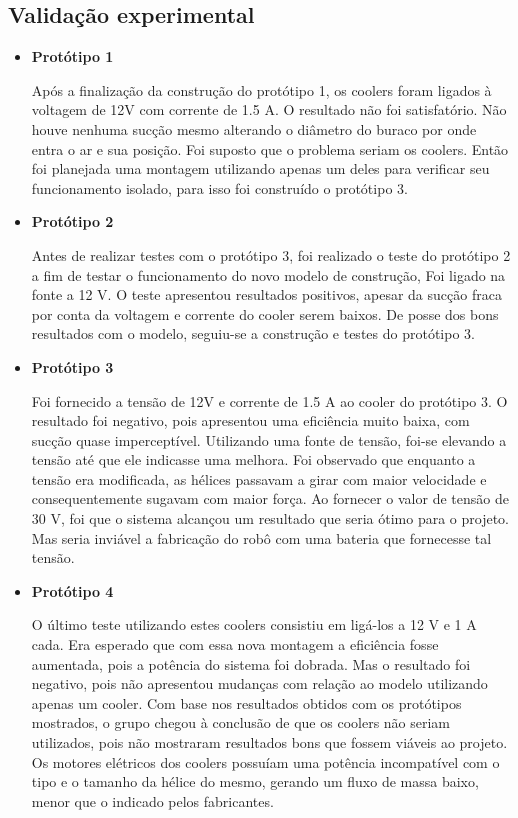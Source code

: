 \subsection{Validação experimental} %
	\label{sub:validação_experimental}
\begin{itemize}
\item \textbf{Protótipo 1}

Após a finalização da construção do protótipo 1, os coolers foram ligados à voltagem de 12V com corrente de 1.5 A. O resultado não foi satisfatório. Não houve nenhuma sucção mesmo alterando o diâmetro do buraco por onde entra o ar e sua posição. Foi suposto que o problema seriam os coolers. Então foi planejada uma montagem utilizando apenas um deles para verificar seu funcionamento isolado, para isso foi construído o protótipo 3. 

\item \textbf{Protótipo 2}

Antes de realizar testes com o protótipo 3, foi realizado o teste do protótipo 2 a fim de testar o funcionamento do novo modelo de construção, Foi ligado na fonte a 12 V. O teste apresentou resultados positivos, apesar da sucção fraca por conta da voltagem e corrente do cooler serem baixos. De posse dos bons resultados com o modelo, seguiu-se a construção e testes do protótipo 3.

\item \textbf{Protótipo 3}

Foi fornecido a tensão de 12V e corrente de 1.5 A ao cooler do protótipo 3. O resultado foi negativo, pois apresentou uma eficiência muito baixa, com sucção quase imperceptível. Utilizando uma fonte de tensão, foi-se elevando a tensão até que ele indicasse uma melhora. Foi observado que enquanto a tensão era modificada, as hélices passavam a girar com maior velocidade e consequentemente sugavam com maior força. Ao fornecer o valor de tensão de 30 V, foi que o sistema alcançou um resultado que seria ótimo para o projeto. Mas seria inviável a fabricação do robô com uma bateria que fornecesse tal tensão.

\item \textbf{Protótipo 4} 

O último teste utilizando estes coolers consistiu em ligá-los a 12 V e 1 A cada. Era esperado que com essa nova montagem a eficiência fosse aumentada, pois a potência do sistema foi dobrada. Mas o resultado foi negativo, pois não apresentou mudanças com relação ao modelo utilizando apenas um cooler. Com base nos resultados obtidos com os protótipos mostrados, o grupo chegou à conclusão de que os coolers não seriam utilizados, pois não mostraram resultados bons que fossem viáveis ao projeto. Os motores elétricos dos coolers possuíam uma potência incompatível com o tipo e o tamanho da hélice do mesmo, gerando um fluxo de massa baixo, menor que o indicado pelos fabricantes. 


\end{itemize}

